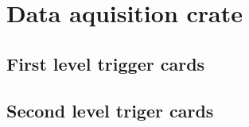 
\chapter{Data aquisition crate}
\label{ch:Content1}

  \section{First level trigger cards}
  \label{ch:Content2:sec:Section1}
 

  \section{Second level triger cards}
  \label{ch:Content2:sec:Section1}
  
  